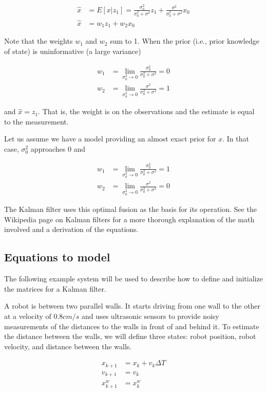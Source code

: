 \begin{align}
  \hat{x} &= E[x|z_1] = \frac{\sigma_0^2}{\sigma_0^2 + \sigma^2}z_1 +
    \frac{\sigma^2}{\sigma_0^2 + \sigma^2}x_0 \\
  \hat{x} &= w_1 z_1 + w_2 x_0 \nonumber
\end{align}

Note that the weights $w_1$ and $w_2$ sum to 1. When the prior (i.e., prior
knowledge of state) is uninformative (a large variance)

\begin{align}
  w_1 &= \lim_{\sigma_0^2 \to 0} \frac{\sigma_0^2}{\sigma_0^2 + \sigma^2} = 0 \\
  w_2 &= \lim_{\sigma_0^2 \to 0} \frac{\sigma^2}{\sigma_0^2 + \sigma^2} = 1
\end{align}

and $\hat{x} = z_1$. That is, the weight is on the observations and the estimate
is equal to the measurement.

Let us assume we have a \gls{model} providing an almost exact prior for $x$. In
that case, $\sigma_0^2$ approaches 0 and

\begin{align}
  w_1 &= \lim_{\sigma_0^2 \to 0} \frac{\sigma_0^2}{\sigma_0^2 + \sigma^2} = 1 \\
  w_2 &= \lim_{\sigma_0^2 \to 0} \frac{\sigma^2}{\sigma_0^2 + \sigma^2} = 0
\end{align}

The Kalman filter uses this optimal fusion as the basis for its operation. See
the Wikipedia page on Kalman filters \cite{bib:kalman_filter} for a more
thorough explanation of the math involved and a derivation of the equations.

\subsection{Equations to model}

The following example system will be used to describe how to define and
initialize the matrices for a Kalman filter.

A robot is between two parallel walls. It starts driving from one wall to the
other at a velocity of $0.8 cm/s$ and uses ultrasonic sensors to provide noisy
measurements of the distances to the walls in front of and behind it. To
estimate the distance between the walls, we will define three states: robot
position, robot velocity, and distance between the walls.

\begin{align}
  x_{k+1} &= x_k + v_k \Delta T \\
  v_{k+1} &= v_k \\
  x_{k+1}^w &= x_k^w
\end{align}

